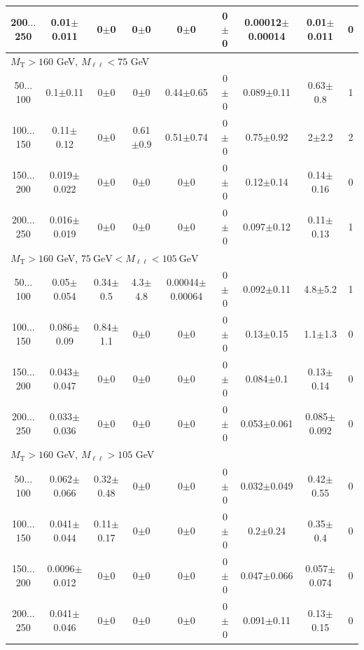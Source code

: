 \begin{landscape}
\begin{table}
\begin{center}
\begin{tabular}{| c | c c c c c c  | c  c | }
200$\dots$250&0.01$\pm$0.011&0$\pm$0&0$\pm$0&0$\pm$0&0$\pm$0&0.00012$\pm$0.00014&0.01$\pm$0.011&0\\
\hline\hline
\multicolumn{7}{l}{$M_{\text{T}} > 160$ GeV, $M_{\ell\ell} < 75$ GeV}\\\hline\hline
50$\dots$100&0.1$\pm$0.11&0$\pm$0&0$\pm$0&0.44$\pm$0.65&0$\pm$0&0.089$\pm$0.11&0.63$\pm$0.8&1\\
100$\dots$150&0.11$\pm$0.12&0$\pm$0&0.61$\pm$0.9&0.51$\pm$0.74&0$\pm$0&0.75$\pm$0.92&2$\pm$2.2&2\\
150$\dots$200&0.019$\pm$0.022&0$\pm$0&0$\pm$0&0$\pm$0&0$\pm$0&0.12$\pm$0.14&0.14$\pm$0.16&0\\
200$\dots$250&0.016$\pm$0.019&0$\pm$0&0$\pm$0&0$\pm$0&0$\pm$0&0.097$\pm$0.12&0.11$\pm$0.13&1\\
\hline\hline
\multicolumn{7}{l}{$M_{\text{T}} > 160$ GeV, $75~\mathrm{GeV} < M_{\ell\ell} < 105~\mathrm{GeV}$}\\\hline\hline
50$\dots$100&0.05$\pm$0.054&0.34$\pm$0.5&4.3$\pm$4.8&0.00044$\pm$0.00064&0$\pm$0&0.092$\pm$0.11&4.8$\pm$5.2&1\\
100$\dots$150&0.086$\pm$0.09&0.84$\pm$1.1&0$\pm$0&0$\pm$0&0$\pm$0&0.13$\pm$0.15&1.1$\pm$1.3&0\\
150$\dots$200&0.043$\pm$0.047&0$\pm$0&0$\pm$0&0$\pm$0&0$\pm$0&0.084$\pm$0.1&0.13$\pm$0.14&0\\
200$\dots$250&0.033$\pm$0.036&0$\pm$0&0$\pm$0&0$\pm$0&0$\pm$0&0.053$\pm$0.061&0.085$\pm$0.092&0\\
\hline\hline
\multicolumn{7}{l}{$M_{\text{T}} > 160$ GeV, $M_{\ell\ell} > 105$ GeV}\\\hline\hline
50$\dots$100&0.062$\pm$0.066&0.32$\pm$0.48&0$\pm$0&0$\pm$0&0$\pm$0&0.032$\pm$0.049&0.42$\pm$0.55&0\\
100$\dots$150&0.041$\pm$0.044&0.11$\pm$0.17&0$\pm$0&0$\pm$0&0$\pm$0&0.2$\pm$0.24&0.35$\pm$0.4&0\\
150$\dots$200&0.0096$\pm$0.012&0$\pm$0&0$\pm$0&0$\pm$0&0$\pm$0&0.047$\pm$0.066&0.057$\pm$0.074&0\\
200$\dots$250&0.041$\pm$0.046&0$\pm$0&0$\pm$0&0$\pm$0&0$\pm$0&0.091$\pm$0.11&0.13$\pm$0.15&0\\
\hline\hline
\end{tabular}
\end{center}
\end{table}
\end{landscape}